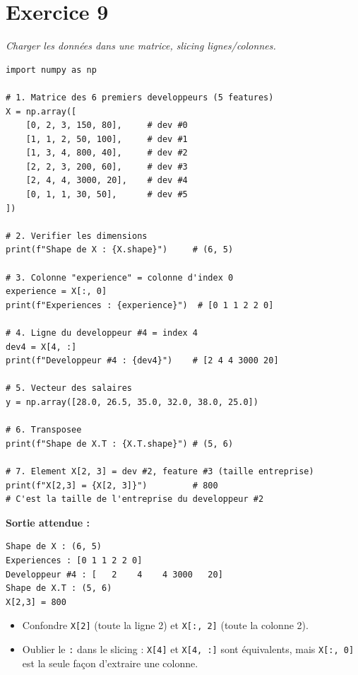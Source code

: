 \section*{Exercice 9 \hfill \exointermediaire}
\textit{Charger les donn\'{e}es dans une matrice, slicing lignes/colonnes.}

\separateur

\begin{pythonbox}
\begin{lstlisting}
import numpy as np

# 1. Matrice des 6 premiers developpeurs (5 features)
X = np.array([
    [0, 2, 3, 150, 80],     # dev #0
    [1, 1, 2, 50, 100],     # dev #1
    [1, 3, 4, 800, 40],     # dev #2
    [2, 2, 3, 200, 60],     # dev #3
    [2, 4, 4, 3000, 20],    # dev #4
    [0, 1, 1, 30, 50],      # dev #5
])

# 2. Verifier les dimensions
print(f"Shape de X : {X.shape}")     # (6, 5)

# 3. Colonne "experience" = colonne d'index 0
experience = X[:, 0]
print(f"Experiences : {experience}")  # [0 1 1 2 2 0]

# 4. Ligne du developpeur #4 = index 4
dev4 = X[4, :]
print(f"Developpeur #4 : {dev4}")    # [2 4 4 3000 20]

# 5. Vecteur des salaires
y = np.array([28.0, 26.5, 35.0, 32.0, 38.0, 25.0])

# 6. Transposee
print(f"Shape de X.T : {X.T.shape}") # (5, 6)

# 7. Element X[2, 3] = dev #2, feature #3 (taille entreprise)
print(f"X[2,3] = {X[2, 3]}")         # 800
# C'est la taille de l'entreprise du developpeur #2
\end{lstlisting}
\end{pythonbox}

\textbf{Sortie attendue :}
\begin{verbatim}
Shape de X : (6, 5)
Experiences : [0 1 1 2 2 0]
Developpeur #4 : [   2    4    4 3000   20]
Shape de X.T : (5, 6)
X[2,3] = 800
\end{verbatim}

\begin{attentionbox}
    \begin{itemize}
        \item Confondre \texttt{X[2]} (toute la ligne 2) et \texttt{X[:, 2]} (toute la colonne 2).
        \item Oublier le \texttt{:} dans le slicing : \texttt{X[4]} et \texttt{X[4, :]} sont \'{e}quivalents, mais \texttt{X[:, 0]} est la seule fa\c{c}on d'extraire une colonne.
    \end{itemize}
\end{attentionbox}

